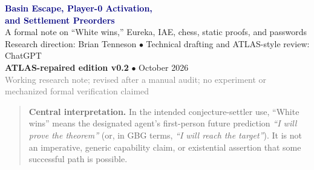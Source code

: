 \documentclass[11pt,letterpaper]{article}
\theoremstyle{remark}
\begin{document}
\begin{center}
{\Large\bfseries\textcolor{navy}{Basin Escape, Player-0 Activation,\\[2pt] and Settlement Preorders}}\\[6pt]
{\normalsize A formal note on ``White wins,'' Eureka, IAE, chess, static proofs, and passwords}\\[7pt]
{\small Research direction: Brian Tenneson \quad $\bullet$ \quad Technical drafting and ATLAS-style review: ChatGPT}\\[3pt]
{\small \textbf{ATLAS-repaired edition v0.2} \quad$\bullet$ October 2026}\\[4pt]
{\small\textcolor{grey}{Working research note; revised after a manual audit; no experiment or mechanized formal verification claimed}}
\end{center}

\begin{quote}\small
\textbf{Central interpretation.} In the intended conjecture-settler use, ``White wins'' means the designated agent's first-person future prediction \emph{``I will prove the theorem''} (or, in GBG terms, \emph{``I will reach the target''}). It is not an imperative, generic capability claim, or existential assertion that some successful path is possible.
\end{quote}

\begin{abstract}\noindent
An automated prover may stall because of its search policy rather than because its fixed theorem is unprovable. We describe three candidate interventions: Player-0 activation of a verifier-gated AMLD+0 federation addressing a first-person settlement event; Eureka search for intermediate lemmas; and Iterative Adaptive Eureka (IAE). A shared BANK accepts only typed, independently verified results and enforces consumer-side assumption discharge. We separate \emph{actual executed success} from \emph{existential certificate reachability}: the latter, with a uniformly budget-preserving operational simulation preorder, supports well-defined upward-closed settlement regions on mutual-simulation classes. In well-founded quotient orders these upper regions have minimal-antichain generators (not necessarily finite). We distinguish adversarial chess, static theorem proving, and fixed versus adaptive passwords, and present a resource-accounted experimental design without claiming unperformed speedup experiments.
\end{abstract}
\end{document}
